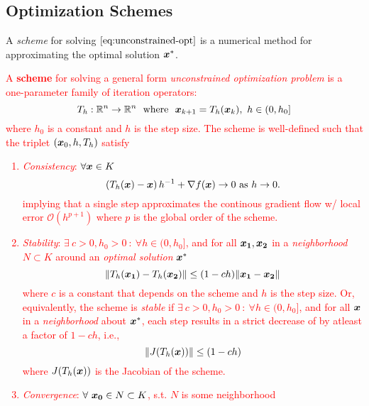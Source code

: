 \documentclass[10pt]{article}
\begin{document}
    \subsection{Optimization Schemes}
    A \emph{scheme} for solving $\eqref{eq:unconstrained-opt}$ is a numerical
    method for approximating the optimal solution $\bm{x}^*$. 

    \textcolor{Red}{
        \begin{definition}
            A \textbf{scheme} for solving a general form \emph{unconstrained optimization problem}
            is a one-parameter family of iteration operators:
            $$
                T_h : \mathbb{R}^n \rightarrow \mathbb{R}^n ~ \text{ where } ~\bm{x}_{k+1} = T_h(\bm{x}_k), ~ h \in (0, h_0]
            $$
            where $h_0$ is a constant and $h$ is the step size. The scheme is well-defined such that
            the triplet $(\bm{x}_0, h, T_h)$ satisfy
            \begin{enumerate}
                \item \emph{Consistency}: $\forall \bm{x} \in K$ 
                $$
                    \left( T_h(\bm{x}) - \bm{x} \right) h^{-1} + \nabla f(\bm{x}) \rightarrow 0 \text{ as } h \rightarrow 0.
                $$
                implying that a single step approximates the continous gradient flow w/ local error
                $\mathcal{O}(h^{p+1})$ where $p$ is the global order of the scheme.
                \item \emph{Stability}: $\exists~ c > 0, h_0 > 0 ~:~ \forall h \in (0, h_0]$,
                and for all $\bm{x_1}, \bm{x_2}$ in a \emph{neighborhood $N \subset K$}
                around an \emph{optimal solution} $\bm{x}^*$
                $$
                    \| T_h(\bm{x_1}) - T_h(\bm{x_2}) \| \leq (1 - ch) \| \bm{x_1} - \bm{x_2} \|
                $$
                where $c$ is a constant that depends on the scheme and $h$ is the step size.
                Or, equivalently, the scheme is \emph{stable} if
                $\exists~ c > 0, h_0 > 0 ~:~ \forall h \in (0, h_0]$,
                and for all $\bm{x}$ in a \emph{neighborhood} about $\bm{x}^*$,
                each step results in a strict decrease of by atleast a factor of $1 - ch$, i.e.,
                $$
                \| J(T_h(\bm{x})) \| \leq (1 - ch)
                $$
                where $J(T_h(\bm{x}))$ is the Jacobian of the scheme.
                \item \emph{Convergence}: $\forall~ \bm{x_0} \in N \subset K$, s.t. $N$ is some neighborhood

\end{enumerate}
\end{definition}}
\end{document}
